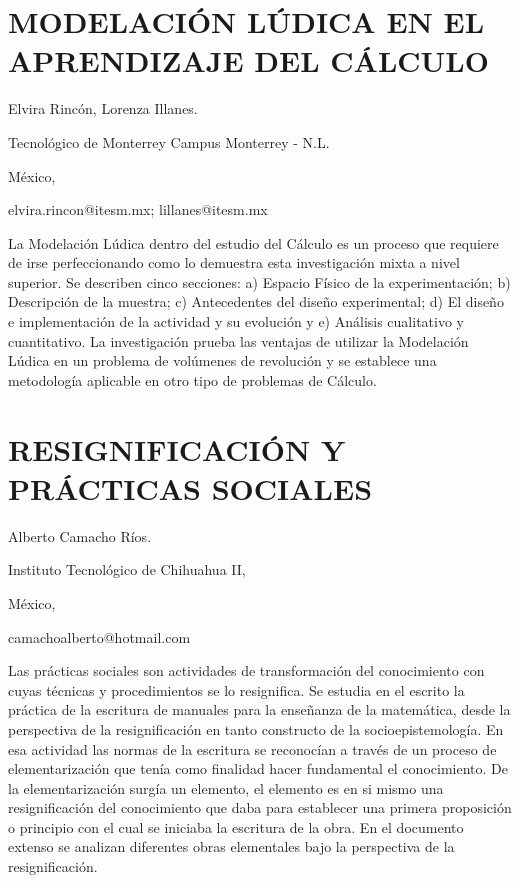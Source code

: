 \section{\uppercase{ MODELACIÓN LÚDICA En el Aprendizaje DEL CÁLCULO}}

\begin{datos}

Elvira Rincón, Lorenza Illanes.

Tecnológico de Monterrey Campus Monterrey - N.L. 

México,

elvira.rincon@itesm.mx; lillanes@itesm.mx

\end{datos}

La Modelación Lúdica dentro del estudio del Cálculo es un proceso
que requiere de irse perfeccionando como lo demuestra esta investigación
mixta a nivel superior. Se describen cinco secciones: a) Espacio Físico
de la experimentación; b) Descripción de la muestra; c) Antecedentes
del diseño experimental; d) El diseño e implementación de la actividad
y su evolución y e) Análisis cualitativo y cuantitativo. La investigación
prueba las ventajas de utilizar la Modelación Lúdica en un problema
de volúmenes de revolución y se establece una metodología aplicable
en otro tipo de problemas de Cálculo.


\section{RESIGNIFICACIÓN Y PRÁCTICAS SOCIALES}

\begin{datos}

Alberto Camacho Ríos.

Instituto Tecnológico de Chihuahua II, 

México,

camachoalberto@hotmail.com

\end{datos}

Las prácticas sociales son actividades de transformación del conocimiento
con cuyas técnicas y procedimientos se lo resignifica. Se estudia
en el escrito la práctica de la escritura de manuales para la enseñanza
de la matemática, desde la perspectiva de la resignificación en tanto
constructo de la socioepistemología. En esa actividad las normas de
la escritura se reconocían a través de un proceso de elementarización
que tenía como finalidad hacer fundamental el conocimiento. De la
elementarización surgía un elemento, el elemento es en si mismo una
resignificación del conocimiento que daba para establecer una primera
proposición o principio con el cual se iniciaba la escritura de la
obra. En el documento extenso se analizan diferentes obras elementales
bajo la perspectiva de la resignificación.


